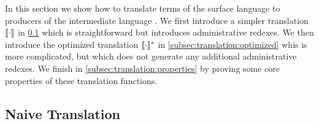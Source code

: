 In this section we show how to translate terms of the surface language \surfacelang{} to producers of the intermediate language \targetlang.
We first introduce a simpler translation $\llbracket \cdot \rrbracket$ in \cref{subsec:translation:naive} which is straightforward but introduces administrative redexes.
We then introduce the optimized translation $\llbracket \cdot \rrbracket_{}^{\ast}$ in \cref{subsec:translation:optimized} whis is more complicated, but which does not generate 
any additional administrative redexes.
We finish in \cref{subsec:translation:properties} by proving some core properties of these translation functions.

\subsection{Naive Translation}
\label{subsec:translation:naive}

